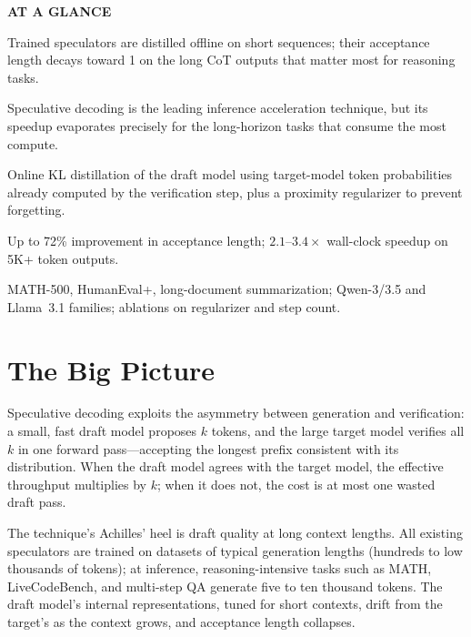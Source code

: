 \documentclass[10pt,twocolumn]{article}
\begin{document}
\begin{mdframed}[backgroundcolor=boxgray,linecolor=rulered,linewidth=1pt,
    innerleftmargin=6pt,innerrightmargin=6pt,
    innertopmargin=6pt,innerbottommargin=6pt]
\textbf{\small AT A GLANCE}\par\vspace{4pt}
\begin{description}[leftmargin=0pt,labelsep=4pt,itemsep=2pt,parsep=0pt,
    font=\small\bfseries]
  \item[Problem:] Trained speculators are distilled offline on short sequences;
    their acceptance length decays toward 1 on the long CoT outputs that matter
    most for reasoning tasks.
  \item[Why it matters:] Speculative decoding is the leading inference
    acceleration technique, but its speedup evaporates precisely for the
    long-horizon tasks that consume the most compute.
  \item[Method:] Online KL distillation of the draft model using
    target-model token probabilities already computed by the verification step,
    plus a proximity regularizer to prevent forgetting.
  \item[Result:] Up to 72\% improvement in acceptance length; $2.1$--$3.4\times$
    wall-clock speedup on 5K+ token outputs.
  \item[Evidence:] MATH-500, HumanEval+, long-document summarization;
    Qwen-3/3.5 and Llama~3.1 families; ablations on regularizer and step count.
\end{description}
\end{mdframed}

\section{The Big Picture}

Speculative decoding exploits the asymmetry between generation and
verification: a small, fast draft model proposes $k$ tokens, and the large
target model verifies all $k$ in one forward pass---accepting the longest
prefix consistent with its distribution. When the draft model agrees with the
target model, the effective throughput multiplies by $k$; when it does not,
the cost is at most one wasted draft pass.

The technique's Achilles' heel is draft quality at long context lengths.
All existing speculators are trained on datasets of typical generation lengths
(hundreds to low thousands of tokens); at inference, reasoning-intensive tasks
such as MATH, LiveCodeBench, and multi-step QA generate five to ten thousand
tokens. The draft model's internal representations, tuned for short contexts,
drift from the target's as the context grows, and acceptance length collapses.
\end{document}
